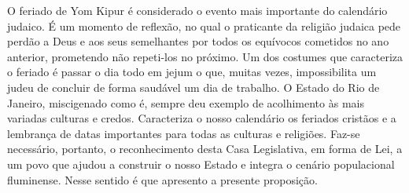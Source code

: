 \documentclass[10pt]{article}
\begin{document}
  	O feriado de Yom Kipur é considerado o evento mais importante do calendário judaico. É um momento de reflexão, no qual o praticante da religião judaica pede perdão a Deus e aos seus semelhantes por todos os equívocos cometidos no ano anterior, prometendo não repeti-los no próximo. Um dos costumes que caracteriza o feriado é passar o dia todo em jejum o que, muitas vezes, impossibilita um judeu de concluir de forma saudável um dia de trabalho. O Estado do Rio de Janeiro, miscigenado como é, sempre deu exemplo de acolhimento às mais variadas culturas e credos. Caracteriza o nosso calendário os feriados cristãos e a lembrança de datas importantes para todas as culturas e religiões. Faz-se necessário, portanto, o reconhecimento desta Casa Legislativa, em forma de Lei, a um povo que ajudou a construir o nosso Estado e integra o cenário populacional fluminense. Nesse sentido é que apresento a presente proposição. 



\iffalse
\begin{center}
  \textbf{REFERÊNCIAS}
\end{center}


\fi
\end{document}
